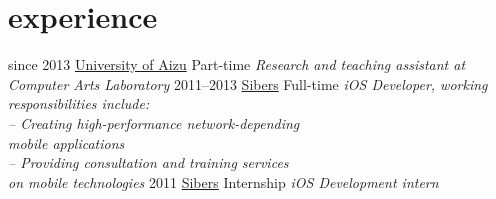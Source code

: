 \documentclass[]{friggeri-cv}
\begin{document}
\section{experience}

\begin{entrylist}
  \entry
    {since 2013}
    {\href{www.u-aizu.ac.jp/}{University of Aizu}}
    {Part-time}
    {\emph{Research and teaching assistant at Computer Arts Laboratory}}
  \entry
    {2011–2013}
    {\href{http://www.sibers.com/}{Sibers}}
    {Full-time}
    {\emph{iOS Developer, working responsibilities include:\\
    			– Creating high-performance network-depending\\
			   mobile applications\\
			– Providing consultation and training services\\
			   on mobile technologies}}
  \entry
    {2011}
    {\href{http://www.sibers.com/}{Sibers}}
    {Internship}
    {\emph{iOS Development intern}}
\end{entrylist}
\end{document}
